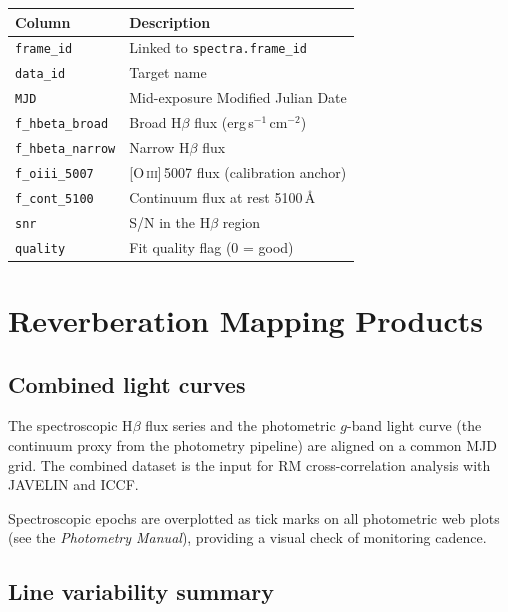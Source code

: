\documentclass[a4paper,12pt]{article}
\begin{document}
\begin{center}
\small
\begin{tabular}{lp{8cm}}
\toprule
Column & Description \\
\midrule
\texttt{frame\_id} & Linked to \texttt{spectra.frame\_id} \\
\texttt{data\_id} & Target name \\
\texttt{MJD} & Mid-exposure Modified Julian Date \\
\texttt{f\_hbeta\_broad} & Broad H$\beta$ flux (erg\,s$^{-1}$\,cm$^{-2}$) \\
\texttt{f\_hbeta\_narrow} & Narrow H$\beta$ flux \\
\texttt{f\_oiii\_5007} & [O\,\textsc{iii}]\,5007 flux (calibration anchor) \\
\texttt{f\_cont\_5100} & Continuum flux at rest 5100\,\AA\ \\
\texttt{snr} & S/N in the H$\beta$ region \\
\texttt{quality} & Fit quality flag (0 = good) \\
\bottomrule
\end{tabular}
\end{center}

\section{Reverberation Mapping Products}
\label{sec:rm}

\subsection{Combined light curves}

The spectroscopic H$\beta$ flux series and the photometric $g$-band light curve
(the continuum proxy from the photometry pipeline) are aligned on a common MJD
grid.  The combined dataset is the input for RM cross-correlation analysis with
\textsc{JAVELIN} and \textsc{ICCF}.

Spectroscopic epochs are overplotted as tick marks on all photometric web plots
(see the \emph{Photometry Manual}), providing a visual check of monitoring
cadence.

\subsection{Line variability summary}
\end{document}
